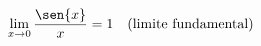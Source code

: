 \begin{ex}
\begin{align}
&\lim_{x\rightarrow 0} \frac{\sen{x}}{x}=1\quad\text{(limite fundamental)}\nonumber
\end{align}
\end{ex}